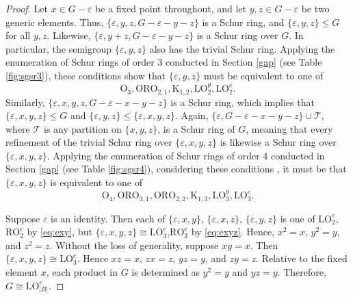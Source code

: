 \documentclass{article}
\theoremstyle{plain}
\theoremstyle{definition}
\newcommand{\T}{\mathcal{T}}
\renewcommand{\O}{\mathrm{O}}
\newcommand{\K}{\mathrm{K}}
\newcommand{\LO}{\mathrm{LO}}
\newcommand{\RO}{\mathrm{RO}}
\newcommand{\ORO}{\mathrm{ORO}}
\begin{document}
\begin{proof}
    Let $x\in G-\varepsilon$ be a fixed point throughout, and let $y,z\in G-\varepsilon$ be two generic elements. Thus, $\{\varepsilon,y,z,G-\varepsilon-y-z\}$ is a Schur ring, and $\{\varepsilon, y,z\} \le G$ for all $y, z$.  Likewise, $\{\varepsilon, y+z, G-\varepsilon-y-z\}$ is a Schur ring over $G$. In particular, the semigroup $\{\varepsilon,y,z\}$ also has the trivial Schur ring. Applying the enumeration of Schur rings of order 3 conducted in Section \ref{gap} (see Table \ref{fig:sgsr3}), these conditions %
     show that $\{\varepsilon, y,z\}$ must be equivalent to one of \begin{equation}\label{eq:exy}\O_3, \ORO_{2,1}, \K_{1,2}, \LO_2^\theta, \LO_2^e.\end{equation} Similarly, $\{\varepsilon, x,y,z,G-\varepsilon-x-y-z\}$ is a Schur ring, which implies that $\{\varepsilon,x,y,z\}\le G$ and $\{\varepsilon, y,z\}\le\{\varepsilon,x,y,z\}$. Again, $\{\varepsilon,G-\varepsilon-x-y-z\}\cup \T$, where $\T$ is any partition on $\{x,y,z\}$, is a Schur ring of $G$, meaning that every refinement of the trivial Schur ring over $\{\varepsilon, x,y,z\}$ is likewise a Schur ring over $\{\varepsilon, x,y,z\}$. Applying the enumeration of Schur rings of order 4 conducted in Section \ref{gap} (see Table \ref{fig:sgsr4}), considering these conditions%
    , it must be that $\{\varepsilon, x,y,z\}$ is equivalent to one of \begin{equation}\label{eq:exyz} \O_4, \ORO_{3,1}, \ORO_{2,2}, \K_{1,3}, \LO_3^\theta, \LO_3^e.\end{equation} 
    
    Suppose $\varepsilon$ is an identity. Then each of $\{\varepsilon,x,y\}$, $\{\varepsilon,x,z\}$, $\{\varepsilon,y,z\}$ is one of $\LO_2^e$, $\RO_2^e$ by \eqref{eq:exy}, but $\{\varepsilon, x,y,z\}\cong \LO_3^e$,$\RO_3^e$  by \eqref{eq:exyz}. Hence, $x^2=x$, $y^2=y$, and $z^2=z$. Without the loss of generality, suppose $xy=x$. Then $\{\varepsilon,x,y,z\}\cong \LO_3^e$. Hence $xz=x$, $zx=z$, $yz=y$, and $zy=z$. Relative to the fixed element $x$, each product in $G$ is determined as $y^2=y$ and $yz=y$. Therefore, $G\cong \LO_{|B|}^e$.
    


\end{proof}
\end{document}

